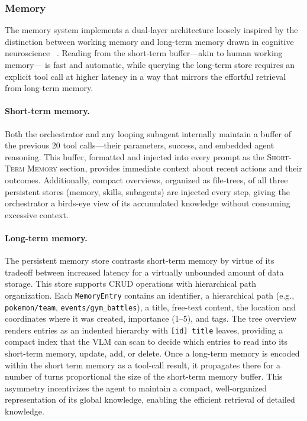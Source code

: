 

\subsubsection{Memory}\label{sec:memory}

The memory system implements a dual-layer architecture loosely inspired by the distinction between working memory and long-term memory drawn in cognitive neuroscience ~\citep{baddeley2000episodic, tulving1972episodic}. Reading from the short-term buffer---akin to human working memory--- is fast and automatic, while querying the long-term store requires an explicit tool call at higher latency in a way that mirrors the effortful retrieval from long-term memory. 

\paragraph{Short-term memory.} Both the orchestrator and any looping subagent internally maintain a buffer of the previous 20 tool calls---their parameters, success, and embedded agent reasoning. This buffer, formatted and injected into every prompt as the \textsc{Short-Term Memory} section, provides immediate context about recent actions and their outcomes. Additionally, compact overviews, organized as file-trees, of all three persistent stores (memory, skills, subagents) are injected every step, giving the orchestrator a birds-eye view of its accumulated knowledge without consuming excessive context.

\paragraph{Long-term memory.} The persistent memory store contrasts short-term memory by virtue of its tradeoff between increased latency for a virtually unbounded amount of data storage. This store supports CRUD operations with hierarchical path organization. Each \texttt{MemoryEntry} contains an identifier, a hierarchical path (e.g., \texttt{pokemon/team}, \texttt{events/gym\_battles}), a title, free-text content, the location and coordinates where it was created, importance (1--5), and tags. The tree overview renders entries as an indented hierarchy with \texttt{[id] title} leaves, providing a compact index that the VLM can scan to decide which entries to read into its short-term memory, update, add, or delete. Once a long-term memory is encoded within the short term memory as a tool-call result, it propagates there for a number of turns proportional the size of the short-term memory buffer. This asymmetry incentivizes the agent to maintain a compact, well-organized representation of its global knowledge, enabling the efficient retrieval of detailed knowledge.

